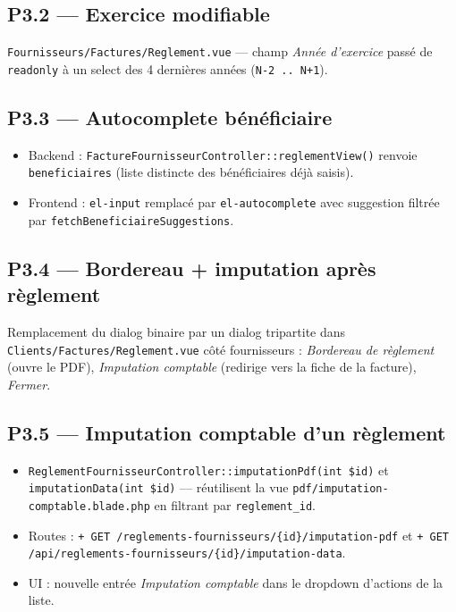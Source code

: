 \documentclass[11pt,a4paper]{article}
\newcommand{\modfile}[1]{\texttt{\small #1}}
\newcommand{\newfile}[1]{\texttt{\small\textcolor{accent}{+ #1}}}
\begin{document}
\subsection{P3.2 --- Exercice modifiable}

\modfile{Fournisseurs/Factures/Reglement.vue} --- champ \emph{Année d'exercice}
passé de \texttt{readonly} à un select des 4 dernières années
(\texttt{N-2 .. N+1}).

\subsection{P3.3 --- Autocomplete bénéficiaire}

\begin{itemize}[leftmargin=1.4em]
  \item Backend : \modfile{FactureFournisseurController::reglementView()} renvoie
    \texttt{beneficiaires} (liste distincte des bénéficiaires déjà saisis).
  \item Frontend : \texttt{el-input} remplacé par \texttt{el-autocomplete} avec
    suggestion filtrée par \texttt{fetchBeneficiaireSuggestions}.
\end{itemize}

\subsection{P3.4 --- Bordereau + imputation après règlement}

Remplacement du dialog binaire par un dialog tripartite dans
\modfile{Clients/Factures/Reglement.vue} côté fournisseurs :
\emph{Bordereau de règlement} (ouvre le PDF), \emph{Imputation comptable}
(redirige vers la fiche de la facture), \emph{Fermer}.

\subsection{P3.5 --- Imputation comptable d'un règlement}

\begin{itemize}[leftmargin=1.4em]
  \item \modfile{ReglementFournisseurController::imputationPdf(int \$id)} et
    \texttt{imputationData(int \$id)} --- réutilisent la vue
    \modfile{pdf/imputation-comptable.blade.php} en filtrant par
    \texttt{reglement\_id}.
  \item Routes : \newfile{GET /reglements-fournisseurs/\{id\}/imputation-pdf} et
    \newfile{GET /api/reglements-fournisseurs/\{id\}/imputation-data}.
  \item UI : nouvelle entrée \emph{Imputation comptable} dans le dropdown
    d'actions de la liste.
\end{itemize}
\end{document}
